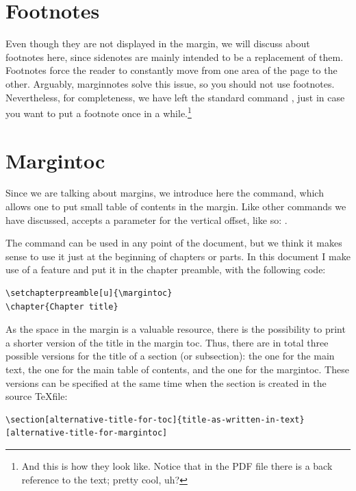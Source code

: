\section{Footnotes}

Even though they are not displayed in the margin, we will discuss about 
footnotes here, since sidenotes are mainly intended to be a replacement 
of them. Footnotes force the reader to constantly move from one area of 
the page to the other. Arguably, marginnotes solve this issue, so you 
should not use footnotes. Nevertheless, for completeness, we have left 
the standard command , just in case you want to put a 
footnote once in a while.\footnote{And this is how they look like. 
Notice that in the PDF file there is a back reference to the text; 
pretty cool, uh?}

\section{Margintoc}

Since we are talking about margins, we introduce here the 
 command, which allows one to put small table of 
contents in the margin. Like other commands we have discussed, 
 accepts a parameter for the vertical offset, like 
so: .

The command can be used in any point of the document, but we think it 
makes sense to use it just at the beginning of chapters or parts. In 
this document I make use of a \KOMAScript\xspace feature and put it in 
the chapter preamble, with the following code:


\begin{lstlisting}[style=kaolstplain]
\setchapterpreamble[u]{\margintoc}
\chapter{Chapter title}
\end{lstlisting}

As the space in the margin is a valuable resource, there is the 
possibility to print a shorter version of the title in the margin toc. 
Thus, there are in total three possible versions for the title of a 
section (or subsection): the one for the main text, the one for the main 
table of contents, and the one for the margintoc. These versions can be 
specified at the same time when the section is created in the source 
\TeX file:
\begin{lstlisting}[style=kaolstplain]
\section[alternative-title-for-toc]{title-as-written-in-text}[alternative-title-for-margintoc]
\end{lstlisting}

